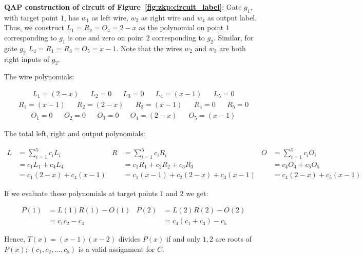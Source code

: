 \textbf{QAP construction of circuit of Figure~\ref{fig:zkp:circuit_label}}: Gate $g_1$, with target point $1$, has $w_1$ as left wire, $w_2$ as right wire and $w_4$ as output label. Thus, we construct $L_1 = R_2 = O_4 = 2 - x$ as the polynomial on point $1$ corresponding to $g_1$ is one and zero on point $2$ corresponding to $g_2$. Similar, for gate $g_2$ $L_4 = R_1 = R_3 = O_5 = x - 1$. Note that the wires $w_2$ and $w_3$ are both right inputs of $g_2$.

The wire polynomials:

\begin{align*}
  L_1 = (2 - x) && L_2 = 0 && L_3 = 0 && L_4 = (x - 1) && L_5 = 0
\end{align*}
\begin{align*}
  R_1 = (x - 1) && R_2 = (2 - x) && R_3 = (x - 1) && R_4 = 0 && R_5 = 0
\end{align*}
\begin{align*}
  O_1 = 0 && O_2 = 0 && O_3 = 0 && O_4 = (2 - x) && O_5 = (x - 1)
\end{align*}

The total left, right and output polynomials:

\begin{align*}
  L &= \sum_{i=1}^{5}c_{i}L_{i} & R &= \sum_{i=1}^{5}c_{i}R_{i} & O &= \sum_{i=1}^{5}c_{i}O_{i} \\
    &= c_1L_1 + c_4L_4 & &= c_1R_1 + c_2R_2 + c_3R_3 & &= c_4O_4 + c_5O_5 \\
    &= c_1(2 - x) + c_4(x - 1) & &= c_1(x - 1) + c_2(2 - x) + c_3(x - 1) & &= c_4(2 - x) + c_5(x - 1)
\end{align*}

If we evaluate these polynomials at target points $1$ and $2$ we get:

\begin{align*}
  P(1) &= L(1)R(1) - O(1) & P(2) &= L(2)R(2) - O(2) \\
       &= c_1c_2 - c_4 & &=c_4(c_1 + c_3) - c_5
\end{align*}

Hence, $T(x) = (x - 1)(x - 2)$ divides $P(x)$ if and only $1, 2$ are roots of $P(x)$; $(c_1, c_2, \dots, c_5)$ is a valid assignment for $C$.
